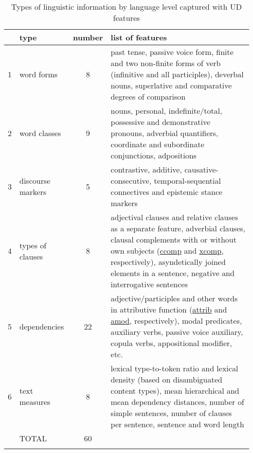 \begin{longtable}[Ht]{@{} l|l|c|p{10cm} @{}}
	\toprule
		& type & number & list of features \\
		\midrule
		1 & word forms & 8 & past tense, passive voice form, finite and two non-finite forms of verb (infinitive and all participles), deverbal nouns, superlative and comparative degrees of comparison \\
		
		2 & word classes & 9 & nouns, personal, indefinite/total, possessive and demonstrative pronouns, adverbial quantifiers, coordinate and subordinate conjunctions, adpositions \\
		
		3 & discourse markers & 5 & contrastive, additive, causative-consecutive, temporal-sequential connectives and epistemic stance markers \\
		
		4 & types of clauses & 8 & adjectival clauses and relative clauses as a separate feature, adverbial clauses, clausal complements with or without own subjects (\hyperlink{ft:ccomp}{ccomp} and \hyperlink{ft:xcomp}{xcomp}, respectively), asyndetically joined elements in a sentence, negative and interrogative sentences \\
		
		5 & dependencies & 22 & adjective/participles and other words in attributive function (\hyperlink{ft:attrib}{attrib} and \hyperlink{ft:amod}{amod}, respectively), modal predicates, auxiliary verbs, passive voice auxiliary, copula verbs, appositional modifier, etc.\\
		
		6 & text measures & 8 & lexical type-to-token ratio and lexical density (based on disambiguated content types), mean hierarchical and mean dependency distances, number of simple sentences, number of clauses per sentence, sentence and word length \\
		\midrule
		& TOTAL & 60 & \\
		\bottomrule

	\caption{\label{tab:feats} Types of linguistic information by language level captured with UD features}\\
\end{longtable}

